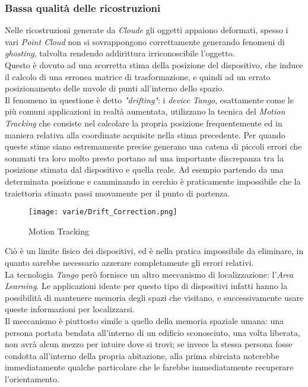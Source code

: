 \subsubsection{Bassa qualità delle ricostruzioni}
Nelle ricostruzioni generate da \emph{Cloude} gli oggetti appaiono deformati, spesso i vari \emph{Point Cloud} non si sovrappongono correttamente generando fenomeni di \emph{ghosting}, talvolta rendendo addirittura irriconoscibile l'oggetto.\\
Questo è dovuto ad una scorretta stima della posizione del dispositivo, che induce il calcolo di una erronea matrice di trasformazione, e quindi ad un errato posizionamento delle nuvole di punti all'interno dello spazio.\\
Il fenomeno in questione è detto \emph{"drifting"}: i \emph{device Tango}, esattamente come le più comuni applicazioni in realtà aumentata, utilizzano la tecnica del \emph{Motion Tracking} che consiste nel calcolare la propria posizione frequentemente ed in maniera relativa alla coordinate acquisite nella stima precedente. Per quando queste stime siano estremamente precise generano una catena di piccoli errori che sommati tra loro molto presto portano ad una importante discrepanza tra la posizione stimata dal dispositivo e quella reale. Ad esempio partendo da una determinata posizione e camminando in cerchio è praticamente impossibile che la traiettoria stimata passi nuovamente per il punto di partenza.
\begin{figure}[!h] 
    \centering 
    \texttt{[image: varie/Drift\_Correction.png]} 
    \caption{Motion Tracking}
\end{figure}
Ciò è un limite fisico dei dispositivi, ed è nella pratica impossibile da eliminare, in quanto sarebbe necessario azzerare completamente gli errori relativi.\\
La tecnologia \emph{Tango} però fornisce un altro meccanismo di localizzazione: l'\emph{Area Learning}. Le applicazioni ideate per questo tipo di dispositivi infatti hanno la possibilità di mantenere memoria degli spazi che visitano, e successivamente usare queste informazioni per localizzarsi.\\
Il meccanismo è piuttosto simile a quello della memoria spaziale umana: una persona portata bendata all'interno di un edificio sconosciuto, una volta liberata, non avrà alcun mezzo per intuire dove si trovi; se invece la stessa persona fosse condotta all'interno della propria abitazione, alla prima sbirciata noterebbe immediatamente qualche particolare che le farebbe immediatamente recuperare l'orientamento.\\
